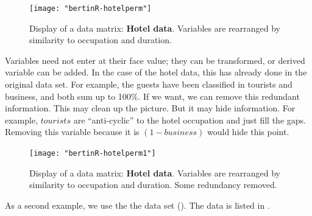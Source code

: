 \documentclass[nogin, dvips,12pt,a4paper,twoside]{amsart}
\begin{document}
%
\begin{figure}[htbp]
\begin{center}
\texttt{[image: "bertinR-hotelperm"]}
\caption{Display of a data matrix: \textbf{Hotel data}. Variables are rearranged by similarity to occupation and duration.}
\label{fig:hotelperm}
\end{center}
\end{figure}

Variables need not enter at their face value; they can be transformed, or derived variable can be added. In the case of the hotel data, this has already done in the original data set. For example, the guests have been classified in tourists and business, and both sum up to 100\%.  If we want, we can remove this redundant information. This may clean up the picture. But it may hide information. For example, $tourists$ are ``anti-cyclic'' to the hotel occupation and just fill the gaps. Removing this variable because it is $(1-business)$ would hide this point.


%
\begin{figure}[htbp]
\begin{center}
\texttt{[image: "bertinR-hotelperm1"]}
\caption{Display of a data matrix: \textbf{Hotel data}. Variables are rearranged by similarity to occupation and duration. Some redundancy removed.}
\label{fig:hotelperm1}
\end{center}
\end{figure}

\clearpage
As a second example, we use the  the  data set (). 
The data  is listed in  .
\end{document}
